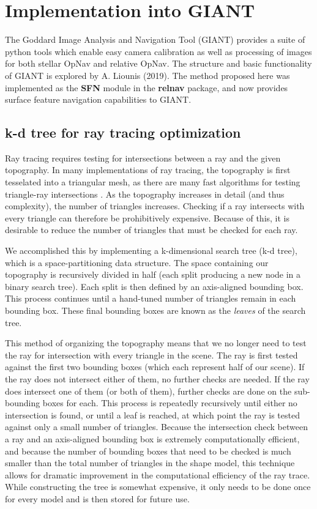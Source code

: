\documentclass{RPI-SIW}
\begin{document}
\section*{Implementation into GIANT}
The Goddard Image Analysis and Navigation Tool (GIANT) provides a suite of python tools which enable easy camera calibration as well as processing of images for both stellar OpNav and relative OpNav. The structure and basic functionality of GIANT is explored by A. Liounis (2019).\cite{giant}  The method proposed here was implemented as the \textbf{SFN} module in the \textbf{relnav} package, and now provides surface feature navigation capabilities to GIANT.

\subsection*{k-d tree for ray tracing optimization}
Ray tracing requires testing for intersections between a ray and the given topography.  In many implementations of ray tracing, the topography is first tesselated into a triangular mesh, as there are many fast algorithms for testing triangle-ray intersections \cite{triangle_ray}.  As the topography increases in detail (and thus complexity), the number of triangles increases.  Checking if a ray intersects with every triangle can therefore be prohibitively expensive.  Because of this, it is desirable to reduce the number of triangles that must be checked for each ray.

We accomplished this by implementing a k-dimensional search tree (k-d tree), which is a space-partitioning data structure.  The space containing our topography is recursively divided in half (each split producing a new node in a binary search tree).  Each split is then defined by an axis-aligned bounding box.  This process continues until a hand-tuned number of triangles remain in each bounding box.  These final bounding boxes are known as the \textit{leaves} of the search tree.

This method of organizing the topography means that we no longer need to test the ray for intersection with every triangle in the scene.  The ray is first tested against the first two bounding boxes (which each represent half of our scene).  If the ray does not intersect either of them, no further checks are needed.  If the ray does intersect one of them (or both of them), further checks are done on the sub-bounding boxes for each.  This process is repeatedly recursively until either no intersection is found, or until a leaf is reached, at which point the ray is tested against only a small number of triangles.  Because the intersection check between a ray and an axis-aligned bounding box is extremely computationally efficient, and because the number of bounding boxes that need to be checked is much smaller than the total number of triangles in the shape model, this technique allows for dramatic improvement in the computational efficiency of the ray trace. 
While constructing the tree is somewhat expensive, it only needs to be done once for every model and is then stored for future use.
\end{document}
